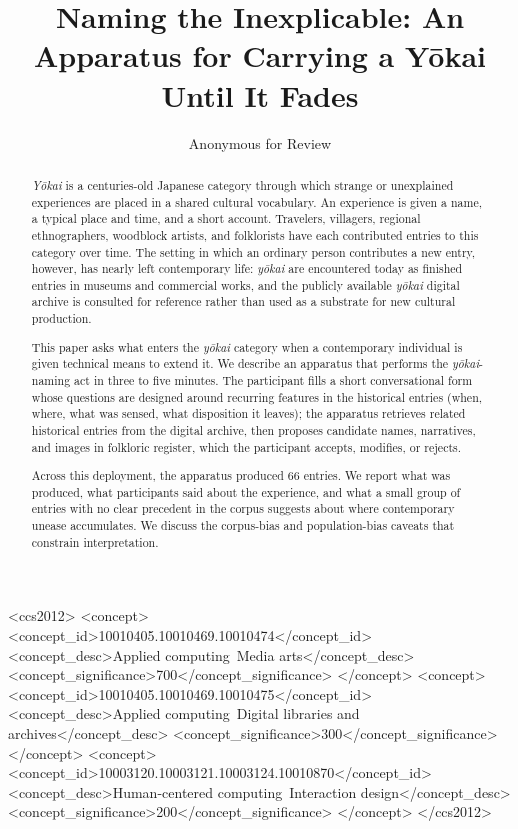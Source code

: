 \documentclass[manuscript,review,anonymous,nonacm]{acmart}
\begin{document}
\title{Naming the Inexplicable: An Apparatus for Carrying a Y\=okai Until It Fades}

\author{Anonymous for Review}

\renewcommand{\shortauthors}{Anonymous}


\begin{abstract}
\textit{Y\=okai} is a centuries-old Japanese category through which strange or unexplained experiences are placed in a shared cultural vocabulary. An experience is given a name, a typical place and time, and a short account. Travelers, villagers, regional ethnographers, woodblock artists, and folklorists have each contributed entries to this category over time. The setting in which an ordinary person contributes a new entry, however, has nearly left contemporary life: \textit{y\=okai} are encountered today as finished entries in museums and commercial works, and the publicly available \textit{y\=okai} digital archive is consulted for reference rather than used as a substrate for new cultural production.

This paper asks what enters the \textit{y\=okai} category when a contemporary individual is given technical means to extend it. We describe an apparatus that performs the \textit{y\=okai}-naming act in three to five minutes. The participant fills a short conversational form whose questions are designed around recurring features in the historical entries (when, where, what was sensed, what disposition it leaves); the apparatus retrieves related historical entries from the digital archive, then proposes candidate names, narratives, and images in folkloric register, which the participant accepts, modifies, or rejects.

Across this deployment, the apparatus produced 66 entries. We report what was produced, what participants said about the experience, and what a small group of entries with no clear precedent in the corpus suggests about where contemporary unease accumulates. We discuss the corpus-bias and population-bias caveats that constrain interpretation.
\end{abstract}

\begin{CCSXML}
<ccs2012>
   <concept>
       <concept_id>10010405.10010469.10010474</concept_id>
       <concept_desc>Applied computing~Media arts</concept_desc>
       <concept_significance>700</concept_significance>
   </concept>
   <concept>
       <concept_id>10010405.10010469.10010475</concept_id>
       <concept_desc>Applied computing~Digital libraries and archives</concept_desc>
       <concept_significance>300</concept_significance>
   </concept>
   <concept>
       <concept_id>10003120.10003121.10003124.10010870</concept_id>
       <concept_desc>Human-centered computing~Interaction design</concept_desc>
       <concept_significance>200</concept_significance>
   </concept>
</ccs2012>
\end{CCSXML}
\end{document}
